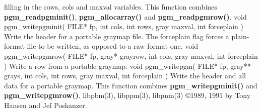 filling in the rows, cols and maxval variables.
This function combines
{\bf pgm\_readpgminit()}{\rm ,}
{\bf pgm\_allocarray()}
and
{\bf pgm\_readpgmrow()}{\rm .}
\Ss
void pgm\_writepgminit( FILE* fp, int cols, int rows, gray maxval, int forceplain )
\Se
Write the header for a portable graymap file.
The forceplain flag forces a plain-format file to be written, as opposed
to a raw-format one.
\Ss
void pgm\_writepgmrow( FILE* fp, gray* grayrow, int cols, gray maxval, int forceplain )
\Se
Write a row from a portable graymap.
\Ss
void pgm\_writepgm( FILE* fp, gray** grays, int cols, int rows, gray maxval, int forceplain )
\Se
Write the header and all data for a portable graymap.
This function combines
{\bf pgm\_writepgminit()}
and
{\bf pgm\_writepgmrow()}{\rm .}
libpbm(3), libppm(3), libpnm(3)
\copyright 1989, 1991 by Tony Hansen and Jef Poskanzer.
%
 
%

\newpage
%

